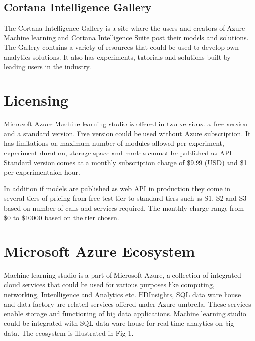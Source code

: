 \documentclass[9pt,twocolumn,twoside]{styles/osajnl}
\begin{document}
\subsection{Cortana Intelligence Gallery}
The Cortana Intelligence Gallery\cite{www-cortanaIntelligenceGallery}
is a site where the users and creators of Azure Machine learning and
Cortana Intelligence Suite post their models and solutions. The
Gallery contains a variety of resources that could be used to develop
own analytics solutions. It also has experiments, tutorials and
solutions built by leading users in the industry.

\section{Licensing}

Microsoft Azure Machine learning studio is offered in two versions: a
free version and a standard version.\cite{www-azureMLPricing} Free
version could be used without Azure subscription. It has limitations
on maximum number of modules allowed per experiment, experiment
duration, storage space and models cannot be published as
API. Standard version comes at a monthly subscription charge of \$9.99
(USD) and \$1 per experimentaion hour.

In addition if models are published as web API in production they come
in several tiers of pricing from free test tier to standard tiers such as
S1, S2 and S3  based on number of calls and services required. The
monthly charge range from \$0 to \$10000 based on the tier chosen.

\section{Microsoft Azure Ecosystem}
Machine learning studio is a part of Microsoft Azure, a collection of
integrated cloud services that could be used for various purposes like
computing, networking, Intenlligence and Analytics etc. HDInsights,
SQL data ware house and data factory are related services offered
under Azure umbrella. These services enable storage and functioning of
big data applications. Machine learning studio could be integrated
with SQL data ware house for real time analytics on big data. The
ecosystem is illustrated in Fig 1.
\end{document}
